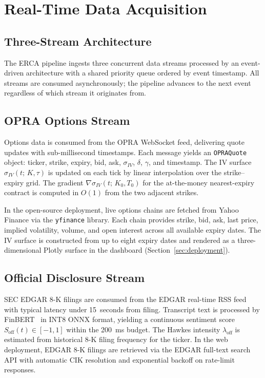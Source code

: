 \documentclass[10pt,twocolumn]{article}
\newcommand{\Soff}{S_{\mathrm{off}}}
\begin{document}
\section{Real-Time Data Acquisition}
\label{sec:data}

\subsection{Three-Stream Architecture}

The ERCA pipeline ingests three concurrent data streams processed by an
event-driven architecture with a shared priority queue ordered by event
timestamp. All streams are consumed asynchronously; the pipeline advances to
the next event regardless of which stream it originates from.

\subsection{OPRA Options Stream}

Options data is consumed from the OPRA WebSocket feed, delivering quote
updates with sub-millisecond timestamps. Each message yields an
\texttt{OPRAQuote} object: ticker, strike, expiry, bid, ask, $\sigma_{IV}$,
$\delta$, $\gamma$, and timestamp. The IV surface $\sigma_{IV}(t;\,K,\tau)$
is updated on each tick by linear interpolation over the strike--expiry grid.
The gradient $\nabla\sigma_{IV}(t;\,K_0,T_0)$ for the at-the-money
nearest-expiry contract is computed in $O(1)$ from the two adjacent strikes.

In the open-source deployment, live options chains are fetched from Yahoo
Finance via the \texttt{yfinance} library. Each chain provides strike, bid,
ask, last price, implied volatility, volume, and open interest across all
available expiry dates. The IV surface is constructed from up to eight
expiry dates and rendered as a three-dimensional Plotly surface in the
dashboard (Section~\ref{sec:deployment}).

\subsection{Official Disclosure Stream}

SEC EDGAR 8-K filings are consumed from the EDGAR real-time RSS feed with
typical latency under 15~seconds from filing. Transcript text is processed by
FinBERT~\cite{araci2019} in INT8 ONNX format, yielding a continuous sentiment
score $\Soff(t)\in[-1,1]$ within the 200~ms budget. The Hawkes intensity
$\lambda_{\mathrm{off}}$ is estimated from historical 8-K filing frequency for
the ticker. In the web deployment, EDGAR 8-K filings are retrieved via the
EDGAR full-text search API with automatic CIK resolution and exponential
backoff on rate-limit responses.
\end{document}
